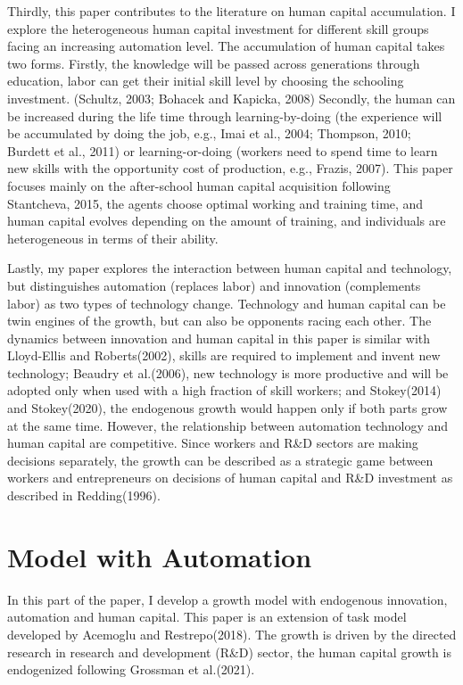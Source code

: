 \documentclass[12pt]{article}
\begin{document}
Thirdly, this paper contributes to the literature on human capital accumulation. I explore the heterogeneous human capital investment for different skill groups facing an increasing automation level. The accumulation of human capital takes two forms. Firstly, the knowledge will be passed across generations through education, labor can get their initial skill level by choosing the schooling investment. (Schultz, 2003\cite{Schultz2003}; Bohacek and Kapicka, 2008\cite{BohacekKapicka2008}) Secondly, the human can be increased during the life time through learning-by-doing (the experience will be accumulated by doing the job, e.g., Imai et al., 2004\cite{Imaietal2004}; Thompson, 2010\cite{Thompson2010}; Burdett et al., 2011\cite{Burdettetal2011}) or learning-or-doing (workers need to spend time to learn new skills with the opportunity cost of production, e.g., Frazis, 2007\cite{Frazis2007}). This paper focuses mainly on the after-school human capital acquisition following Stantcheva, 2015\cite{Stantcheva2015}, the agents choose optimal working and training time, and human capital evolves depending on the amount of training, and individuals are heterogeneous in terms of their ability. 

Lastly, my paper explores the interaction between human capital and technology, but distinguishes automation (replaces labor) and innovation (complements labor) as two types of technology change. Technology and human capital can be twin engines of the growth, but can also be opponents racing each other. The dynamics between innovation and human capital in this paper is similar with Lloyd-Ellis and Roberts(2002)\cite{Lloyd-EllisRoberts2002}, skills are required to implement and invent new technology; Beaudry et al.(2006)\cite{Beaudryetal2006}, new technology is more productive and will be adopted only when used with a high fraction of skill workers; and Stokey(2014)\cite{Stokey2014} and Stokey(2020)\cite{Stokey2020}, the endogenous growth would happen only if both parts grow at the same time. However, the relationship between automation technology and human capital are competitive. Since workers and R\&D sectors are making decisions separately, the growth can be described as a strategic game between workers and entrepreneurs on decisions of human capital and R\&D investment as described in Redding(1996)\cite{Redding1996}.


\section{Model with Automation}
In this part of the paper, I develop a growth model with endogenous innovation, automation and human capital. This paper is an extension of task model developed by Acemoglu and Restrepo(2018)\cite{AcemogluRestrepo2018}. The growth is driven by the directed research in research and development (R\&D) sector, the human capital growth is endogenized following Grossman et al.(2021)\cite{Grossmanetal2021}.
\end{document}
